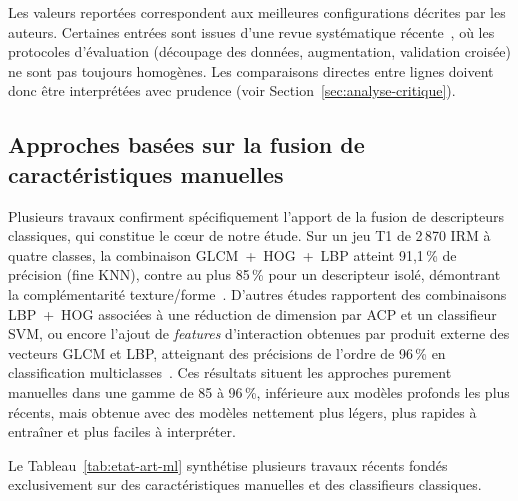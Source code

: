 \begin{notebox}
Les valeurs reportées correspondent aux meilleures configurations décrites par les auteurs.
Certaines entrées sont issues d'une revue systématique récente~\cite{ref-review}, où les
protocoles d'évaluation (découpage des données, augmentation, validation croisée) ne sont pas
toujours homogènes. Les comparaisons directes entre lignes doivent donc être interprétées avec
prudence (voir Section~\ref{sec:analyse-critique}).
\end{notebox}

\subsection{Approches basées sur la fusion de caractéristiques manuelles}

Plusieurs travaux confirment spécifiquement l'apport de la fusion de descripteurs classiques,
qui constitue le c\oe{}ur de notre étude. Sur un jeu T1 de 2\,870 IRM à quatre classes, la
combinaison GLCM~+~HOG~+~LBP atteint 91,1\,\% de précision (fine KNN), contre au plus 85\,\%
pour un descripteur isolé, démontrant la complémentarité texture/forme~\cite{ref-pattanaik}. D'autres
études rapportent des combinaisons LBP~+~HOG associées à une réduction de dimension par ACP et
un classifieur SVM, ou encore l'ajout de \emph{features} d'interaction obtenues par produit
externe des vecteurs GLCM et LBP, atteignant des précisions de l'ordre de 96\,\% en
classification multiclasses~\cite{ref-basthikodi,ref-review}. Ces résultats situent les approches
purement manuelles dans une gamme de 85 à 96\,\%, inférieure aux modèles profonds les plus
récents, mais obtenue avec des modèles nettement plus légers, plus rapides à entraîner et plus
faciles à interpréter.

Le Tableau~\ref{tab:etat-art-ml} synthétise plusieurs travaux récents fondés exclusivement sur
des caractéristiques manuelles et des classifieurs classiques.

